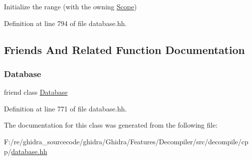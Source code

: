 Initialize the range (with the owning \mbox{\hyperlink{class_scope}{Scope}}) 



Definition at line 794 of file database.\+hh.



\subsection{Friends And Related Function Documentation}
\mbox{\label{class_scope_mapper_a6efef52d7a939622bbc934ff6b90ffe0}} 
\subsubsection{\texorpdfstring{Database}{Database}}
{\footnotesize\ttfamily friend class \mbox{\hyperlink{class_database}{Database}}\hspace{0.3cm}{\ttfamily [friend]}}



Definition at line 771 of file database.\+hh.



The documentation for this class was generated from the following file\+:\begin{DoxyCompactItemize}
\item 
F\+:/re/ghidra\+\_\+sourcecode/ghidra/\+Ghidra/\+Features/\+Decompiler/src/decompile/cpp/\mbox{\hyperlink{database_8hh}{database.\+hh}}\end{DoxyCompactItemize}

